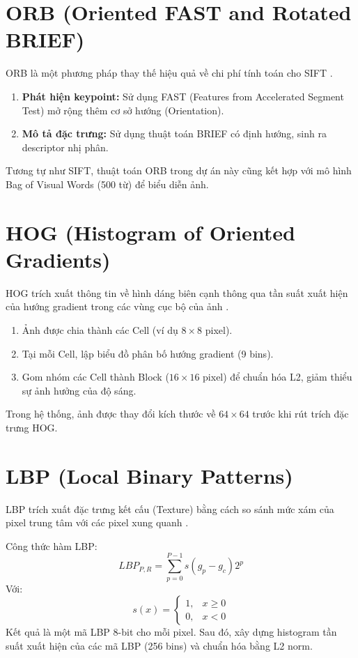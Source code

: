 \section{ORB (Oriented FAST and Rotated BRIEF)}
ORB là một phương pháp thay thế hiệu quả về chi phí tính toán cho SIFT \cite{rublee2011orb}. 
\begin{enumerate}
    \item \textbf{Phát hiện keypoint:} Sử dụng FAST (Features from Accelerated Segment Test) mở rộng thêm cơ sở hướng (Orientation).
    \item \textbf{Mô tả đặc trưng:} Sử dụng thuật toán BRIEF có định hướng, sinh ra descriptor nhị phân.
\end{enumerate}
Tương tự như SIFT, thuật toán ORB trong dự án này cũng kết hợp với mô hình Bag of Visual Words (500 từ) để biểu diễn ảnh.

\section{HOG (Histogram of Oriented Gradients)}
HOG trích xuất thông tin về hình dáng biên cạnh thông qua tần suất xuất hiện của hướng gradient trong các vùng cục bộ của ảnh \cite{dalal2005histograms}.
\begin{enumerate}
    \item Ảnh được chia thành các Cell (ví dụ $8 \times 8$ pixel).
    \item Tại mỗi Cell, lập biểu đồ phân bố hướng gradient (9 bins).
    \item Gom nhóm các Cell thành Block ($16 \times 16$ pixel) để chuẩn hóa L2, giảm thiểu sự ảnh hưởng của độ sáng.
\end{enumerate}
Trong hệ thống, ảnh được thay đổi kích thước về $64 \times 64$ trước khi rút trích đặc trưng HOG.

\section{LBP (Local Binary Patterns)}
LBP trích xuất đặc trưng kết cấu (Texture) bằng cách so sánh mức xám của pixel trung tâm với các pixel xung quanh \cite{ojala2002multiresolution}.

Công thức hàm LBP:
\begin{equation}
LBP_{P,R} = \sum_{p=0}^{P-1} s(g_p - g_c) 2^p
\end{equation}
Với:
\begin{equation}
s(x) =
\begin{cases}
1, & x \geq 0\\
0, & x < 0
\end{cases}
\end{equation}
Kết quả là một mã LBP 8-bit cho mỗi pixel. Sau đó, xây dựng histogram tần suất xuất hiện của các mã LBP (256 bins) và chuẩn hóa bằng L2 norm.

